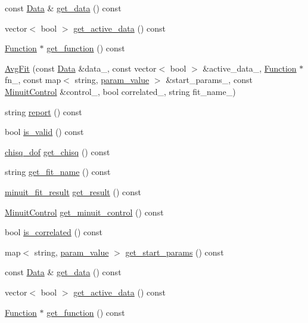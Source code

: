 \begin{DoxyCompactItemize}
const \mbox{\hyperlink{classData}{Data}} \& \mbox{\hyperlink{classAvgFit_aab0805acd73d39676069431db93684ed}{get\+\_\+data}} () const
\item 
vector$<$ bool $>$ \mbox{\hyperlink{classAvgFit_aafbaf377162566bd059950a6a4e454e9}{get\+\_\+active\+\_\+data}} () const
\item 
\mbox{\hyperlink{classFunction}{Function}} $\ast$ \mbox{\hyperlink{classAvgFit_a40e757ad0dc9563c684491165bee9baa}{get\+\_\+function}} () const
\item 
\mbox{\hyperlink{classAvgFit_a578a5426ad4b8bf8caea1dad68b014ac}{Avg\+Fit}} (const \mbox{\hyperlink{classData}{Data}} \&data\+\_\+, const vector$<$ bool $>$ \&active\+\_\+data\+\_\+, \mbox{\hyperlink{classFunction}{Function}} $\ast$fn\+\_\+, const map$<$ string, \mbox{\hyperlink{structparam__value}{param\+\_\+value}} $>$ \&start\+\_\+params\+\_\+, const \mbox{\hyperlink{structMinuitControl}{Minuit\+Control}} \&control\+\_\+, bool correlated\+\_\+, string fit\+\_\+name\+\_\+)
\item 
string \mbox{\hyperlink{classAvgFit_a78ac6ba410c7f44b543e3b7202e046ca}{report}} () const
\item 
bool \mbox{\hyperlink{classAvgFit_a9a906abeb09e724f98fc8b77aff0ea6d}{is\+\_\+valid}} () const
\item 
\mbox{\hyperlink{structchisq__dof}{chisq\+\_\+dof}} \mbox{\hyperlink{classAvgFit_ad4b8b6e5bf145cbeb62b02787612f226}{get\+\_\+chisq}} () const
\item 
string \mbox{\hyperlink{classAvgFit_af9fc84ffb95d3b08daa27ee377892537}{get\+\_\+fit\+\_\+name}} () const
\item 
\mbox{\hyperlink{structminuit__fit__result}{minuit\+\_\+fit\+\_\+result}} \mbox{\hyperlink{classAvgFit_a2d288928c4cf2f92ee28fce2503da979}{get\+\_\+result}} () const
\item 
\mbox{\hyperlink{structMinuitControl}{Minuit\+Control}} \mbox{\hyperlink{classAvgFit_a2a1fb43d6a70a74e39d7d05de9fe5e5d}{get\+\_\+minuit\+\_\+control}} () const
\item 
bool \mbox{\hyperlink{classAvgFit_af828c76e39fea9326e2828e176abb1c4}{is\+\_\+correlated}} () const
\item 
map$<$ string, \mbox{\hyperlink{structparam__value}{param\+\_\+value}} $>$ \mbox{\hyperlink{classAvgFit_a7823eaaddd8f06848f2c092886076d0d}{get\+\_\+start\+\_\+params}} () const
\item 
const \mbox{\hyperlink{classData}{Data}} \& \mbox{\hyperlink{classAvgFit_aab0805acd73d39676069431db93684ed}{get\+\_\+data}} () const
\item 
vector$<$ bool $>$ \mbox{\hyperlink{classAvgFit_aafbaf377162566bd059950a6a4e454e9}{get\+\_\+active\+\_\+data}} () const
\item 
\mbox{\hyperlink{classFunction}{Function}} $\ast$ \mbox{\hyperlink{classAvgFit_a40e757ad0dc9563c684491165bee9baa}{get\+\_\+function}} () const
\end{DoxyCompactItemize}


